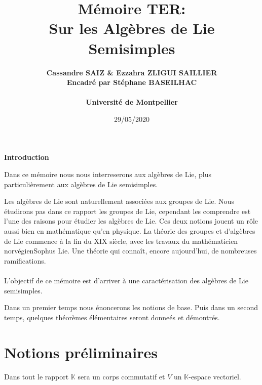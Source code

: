 \documentclass[a4paper,openany,12pt]{report}
\title{\textbf{Mémoire TER: \\ Sur les Algèbres de Lie Semisimples}}
\author{\bf Cassandre SAIZ \& Ezzahra ZLIGUI SAILLIER \\ \bf Encadré par Stéphane BASEILHAC \\ \\Université de Montpellier}
\date{29/05/2020}
\newcommand{\KK}{\mathbb{K}}
\theoremstyle{break}
{\theorembodyfont{\upshape}
\newtheorem*{rmq}{Remarque :}
\newtheorem*{prv}{Preuve :}
\newtheorem*{ex}{Exemples :}
\newtheorem*{exe}{Exemple : }
\newtheorem*{nota}{Notation :}
\newtheorem*{dem}{D\'emonstration :}}
\begin{document}
 

\maketitle
\thispagestyle{fancy}


\begin{center}
\huge{\vspace*{2cm}\textbf{Introduction}}
\end{center}

\quad Dans ce mémoire nous nous interreserons aux algèbres de Lie, plus particulièrement aux algèbres de Lie semisimples.

Les algèbres de Lie sont naturellement associées aux groupes de Lie. Nous étudirons pas dans ce rapport les groupes de Lie, cependant les comprendre est l'une des raisons pour étudier les algèbres de Lie. Ces deux notions jouent un rôle aussi bien en mathématique qu'en physique. La théorie des groupes et d'algèbres de Lie commence à la fin du XIX siècle, avec les travaux du mathématicien norvégien\enskip Sophus Lie.  Une théorie qui connaît, encore aujourd'hui, de nombreuses ramifications.\\
\\
L'objectif de ce mémoire est d'arriver à une caractérisation des algèbres de Lie semisimples. 

Dans un premier temps nous énoncerons les notions de base. Puis dans un second temps, quelques théorèmes élémentaires seront donneés et démontrés.
 

\vspace*{2cm}
    \newpage 

\newpage
\vspace{4mm}
\clearpage
\tableofcontents
\clearpage

\chapter{Notions préliminaires }
Dans tout le rapport $\KK$ sera un corps commutatif et $V$ un $\KK$-espace vectoriel.
\end{document}
